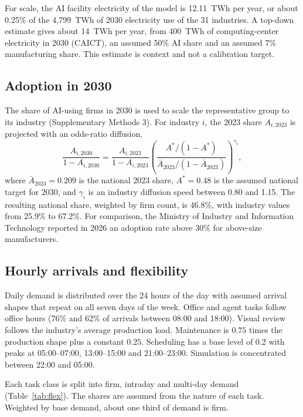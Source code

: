 \documentclass[11pt]{article}
\begin{document}
For scale, the AI facility electricity of the model is 12.11~TWh per year, or about 0.25\% of the 4,799~TWh of 2030 electricity use of the 31 industries. A top-down estimate gives about 14~TWh per year, from 400~TWh of computing-center electricity in 2030 (CAICT), an assumed 50\% AI share and an assumed 7\% manufacturing share. This estimate is context and not a calibration target.

\subsection*{Adoption in 2030}
The share of AI-using firms in 2030 is used to scale the representative group to its industry (Supplementary Methods 3). For industry $i$, the 2023 share $A_{i,2023}$ is projected with an odds-ratio diffusion,
\begin{equation}
\frac{A_{i,2030}}{1-A_{i,2030}}=\frac{A_{i,2023}}{1-A_{i,2023}}\left(\frac{A^{*}/(1-A^{*})}{\bar A_{2023}/(1-\bar A_{2023})}\right)^{\gamma_i},\label{eq:adoption}
\end{equation}
where $\bar A_{2023}=0.209$ is the national 2023 share, $A^{*}=0.48$ is the assumed national target for 2030, and $\gamma_i$ is an industry diffusion speed between 0.80 and 1.15. The resulting national share, weighted by firm count, is 46.8\%, with industry values from 25.9\% to 67.2\%. For comparison, the Ministry of Industry and Information Technology reported in 2026 an adoption rate above 30\% for above-size manufacturers.

\subsection*{Hourly arrivals and flexibility}
Daily demand is distributed over the 24 hours of the day with assumed arrival shapes that repeat on all seven days of the week. Office and agent tasks follow office hours (76\% and 62\% of arrivals between 08:00 and 18:00). Visual review follows the industry's average production load. Maintenance is $0.75$ times the production shape plus a constant $0.25$. Scheduling has a base level of 0.2 with peaks at 05:00--07:00, 13:00--15:00 and 21:00--23:00. Simulation is concentrated between 22:00 and 05:00.

Each task class is split into firm, intraday and multi-day demand (Table~\ref{tab:flex}). The shares are assumed from the nature of each task. Weighted by base demand, about one third of demand is firm.
\end{document}
